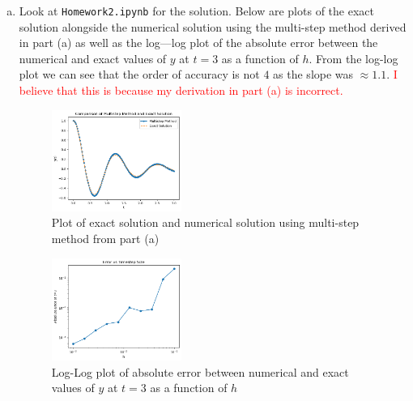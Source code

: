 \documentclass{article}
\begin{document}
\begin{enumerate}[(a)]
        \item Look at \texttt{Homework2.ipynb} for the solution. Below are plots of the exact solution alongside the numerical solution using the multi-step method derived in part (a) as well as the log---log plot of the absolute error between the numerical and exact values of $y$ at $t = 3$ as a function of $h$. From the log-log plot we can see that the order of accuracy is not $4$ as the slope was $\approx 1.1$. {\textcolor{red}{I believe that this is because my derivation in part (a) is incorrect.}}
        \begin{figure}[H]
            \centering
            \includegraphics[width=0.4\textwidth]{Q3c1.png}
            \caption{Plot of exact solution and numerical solution using multi-step method from part (a)}
        \end{figure}
        \begin{figure}[H]
            \centering
            \includegraphics[width=0.4\textwidth]{Q3c2.png}
            \caption{Log-Log plot of absolute error between numerical and exact values of $y$ at $t = 3$ as a function of $h$}
        \end{figure}


\end{enumerate}
\end{document}
